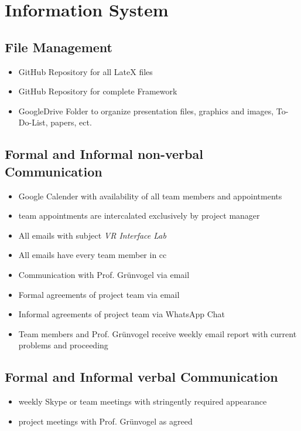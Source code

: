 \documentclass[a4paper, 12pt]{article}
\begin{document}
\section{Information System}
\subsection{File Management}
\begin{itemize}
\item GitHub Repository for all LateX files
\item GitHub Repository for complete Framework
\item GoogleDrive Folder to organize presentation files, graphics and images, To-Do-List, papers, ect. 
\end{itemize}

\subsection{Formal and Informal non-verbal Communication}
\begin{itemize}
\item Google Calender with availability of all team members and appointments
\item team appointments are  intercalated exclusively by project manager
\item All emails with subject \textit{VR Interface Lab} 
\item All emails have every team member in cc
\item Communication with Prof. Grünvogel via email
\item Formal agreements of project team via email
\item Informal agreements of project team via WhatsApp Chat
\item Team members and Prof. Grünvogel receive weekly email report with current problems and proceeding 
\end{itemize}
\subsection{Formal and Informal verbal Communication}
\begin{itemize}
	\item weekly Skype or team meetings with stringently required appearance
	\item project meetings with Prof. Grünvogel as agreed 
\end{itemize}
\end{document}
